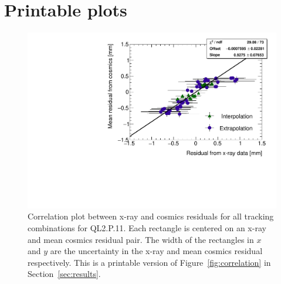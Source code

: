 
\chapter[Printable plots]{Printable plots}
\label{appendix:print}

\begin{figure}
    \centering
    \includegraphics[width = \textwidth]{figures/figure_QL2P11_3100V_2021-08-05_QL2P11_local_cosmic_and_xray_data_correlation_plot_printable.pdf}
    \caption{Correlation plot between x-ray and cosmics residuals for all tracking combinations for QL2.P.11. Each rectangle is centered on an x-ray and mean cosmics residual pair. The width of the rectangles in $x$ and $y$ are the uncertainty in the x-ray and mean cosmics residual respectively. This is a printable version of Figure~\ref{fig:correlation} in Section~\ref{sec:results}.}
    \label{fig:correlation_print}
\end{figure}

